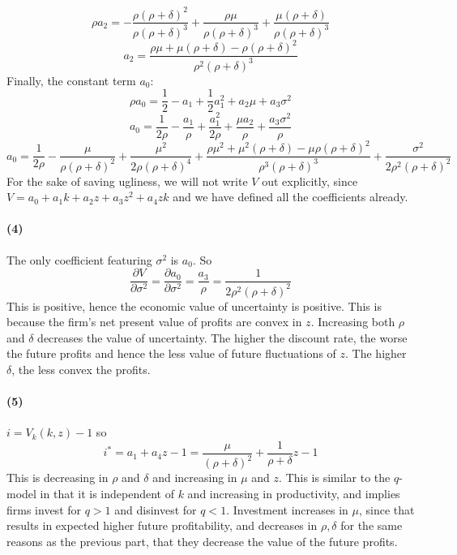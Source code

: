 \documentclass[10pt,letter]{article}
\newcommand{\problempart}[1]{\paragraph{#1}}
\begin{document}
\[ \rho a_2 = - \frac{\rho(\rho + \delta)^2}{\rho(\rho + \delta)^3} + \frac{\rho \mu}{\rho(\rho + \delta)^3} + \frac{\mu(\rho + \delta)}{\rho(\rho+\delta)^3}\]
\[ a_2 =  \frac{\rho \mu + \mu(\rho + \delta) - \rho(\rho + \delta)^2}{\rho^2(\rho + \delta)^3} \]
Finally, the constant term $a_0$:
\[ \rho a_0 = \frac{1}{2}-a_1 + \frac{1}{2}a_1^2 + a_2 \mu + a_3 \sigma^2 \]
\[ a_0 = \frac{1}{2\rho} - \frac{a_1}{\rho} + \frac{a_1^2}{2\rho} + \frac{\mu a_2}{\rho } + \frac{a_3\sigma^2}{\rho} \]
\[ a_0 = \frac{1}{2\rho} - \frac{\mu}{\rho(\rho + \delta)^2}+ \frac{\mu^2}{2\rho (\rho + \delta)^4} + \frac{\rho \mu^2 + \mu^2(\rho + \delta) - \mu \rho(\rho + \delta)^2}{\rho^3(\rho + \delta)^3} + \frac{\sigma^2}{2\rho^2(\rho+\delta)^2} \]
For the sake of saving ugliness, we will not write $V$ out explicitly, since $V = a_0 + a_1k + a_2 z + a_3 z^2 + a_4 zk$ and we have defined all the coefficients already.
\problempart{(4)}
The only coefficient featuring $\sigma^2$ is $a_0$. So
\[ \frac{\partial V}{\partial \sigma^2} = \frac{\partial a_0}{\partial \sigma^2} = \frac{a_3}{\rho} = \frac{1}{2\rho^2(\rho+\delta)^2} \]
This is positive, hence the economic value of uncertainty is positive. This is because the firm's net present value of profits are convex in $z$. Increasing both $\rho$ and $\delta$ decreases the value of uncertainty. The higher the discount rate, the worse the future profits and hence the less value of future fluctuations of $z$. The higher $\delta$, the less convex the profits.
\problempart{(5)}
$i = V_k(k,z) - 1$ so
\[ i^* = a_1 + a_4 z - 1 = \frac{\mu}{(\rho + \delta)^2} + \frac{1}{\rho + \delta}z - 1 \]
This is decreasing in $\rho$ and $\delta$ and increasing in $\mu$ and $z$. This is similar to the $q$-model in that it is independent of $k$ and increasing in productivity, and implies firms invest for $q > 1$ and disinvest for $q < 1$. Investment increases in $\mu$, since that results in expected higher future profitability, and decreases in $\rho, \delta$ for the same reasons as the previous part, that they decrease the value of the future profits.
\end{document}
